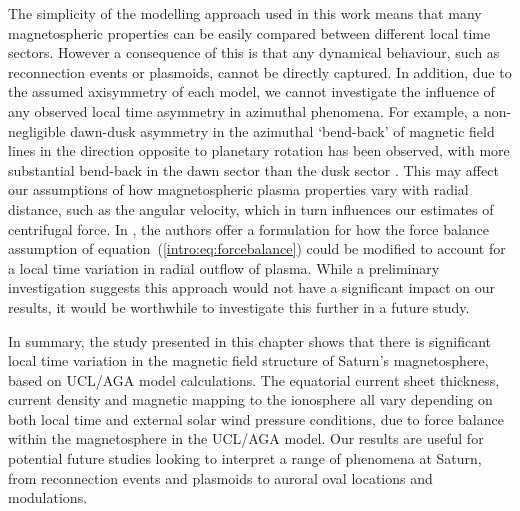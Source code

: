 The simplicity of the modelling approach used in this work means that many magnetospheric properties can be easily compared between different local time sectors. However a consequence of this is that any dynamical behaviour, such as reconnection events or plasmoids, cannot be directly captured. In addition, due to the assumed axisymmetry of each model, we cannot investigate the influence of any observed local time asymmetry in azimuthal phenomena. For example, a non-negligible dawn-dusk asymmetry in the azimuthal `bend-back' of magnetic field lines in the direction opposite to planetary rotation has been observed, with more substantial bend-back in the dawn sector than the dusk sector \citep[e.g.][]{delamere2015}. This may affect our assumptions of how magnetospheric plasma properties vary with radial distance, such as the angular velocity, which in turn influences our estimates of centrifugal force. In \citet{jia2016}, the authors offer a formulation for how the force balance assumption of equation~(\ref{intro:eq:forcebalance}) could be modified to account for a local time variation in radial outflow of plasma. While a preliminary investigation suggests this approach would not have a significant impact on our results, it would be worthwhile to investigate this further in a future study.

In summary, the study presented in this chapter shows that there is significant local time variation in the magnetic field structure of Saturn's magnetosphere, based on UCL/AGA model calculations. The equatorial current sheet thickness, current density and magnetic mapping to the ionosphere all vary depending on both local time and external solar wind pressure conditions, due to force balance within the magnetosphere in the UCL/AGA model. Our results are useful for potential future studies looking to interpret a range of phenomena at Saturn, from reconnection events and plasmoids to auroral oval locations and modulations. 